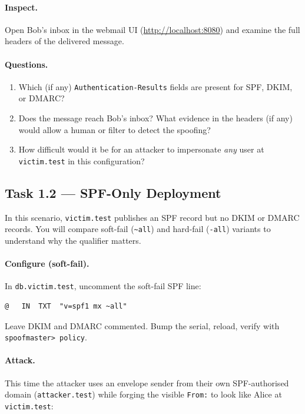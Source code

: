 \documentclass[11pt]{article}
\begin{document}
\paragraph{Inspect.}
Open Bob's inbox in the webmail UI (\url{http://localhost:8080}) and
examine the full headers of the delivered message.

\paragraph{Questions.}
\begin{enumerate}[noitemsep]
  \item Which (if any) \texttt{Authentication-Results} fields are
        present for SPF, DKIM, or DMARC?
  \item Does the message reach Bob's inbox? What evidence in the
        headers (if any) would allow a human or filter to detect the
        spoofing?
  \item How difficult would it be for an attacker to impersonate
        \emph{any} user at \texttt{victim.test} in this configuration?
\end{enumerate}

\subsection{Task 1.2 --- SPF-Only Deployment}

In this scenario, \texttt{victim.test} publishes an SPF record but no
DKIM or DMARC records. You will compare soft-fail
(\texttt{\textasciitilde all}) and hard-fail (\texttt{-all}) variants
to understand why the qualifier matters.

\paragraph{Configure (soft-fail).}
In \texttt{db.victim.test}, uncomment the soft-fail SPF line:

\begin{listing}[H]
\begin{verbatim}
@   IN  TXT  "v=spf1 mx ~all"
\end{verbatim}
\end{listing}

Leave DKIM and DMARC commented. Bump the serial, reload, verify with
\texttt{spoofmaster> policy}.

\paragraph{Attack.}
This time the attacker uses an envelope sender from their own
SPF-authorised domain (\texttt{attacker.test}) while forging the
visible \texttt{From:} to look like Alice at \texttt{victim.test}:
\end{document}
